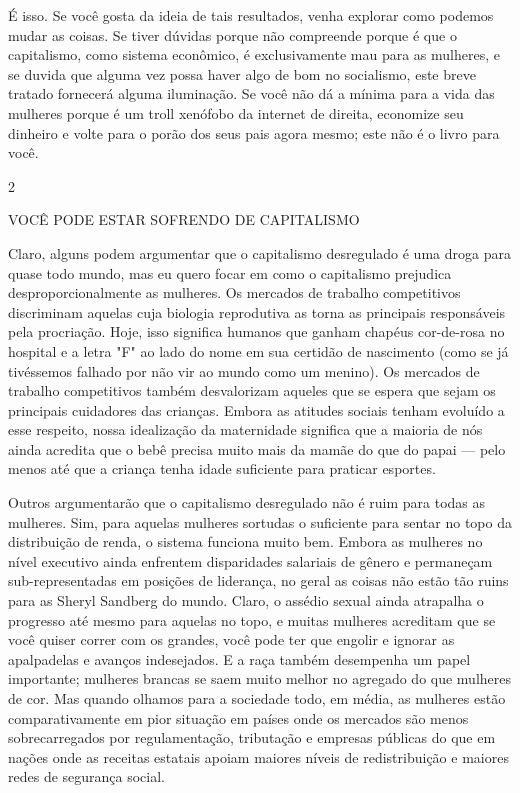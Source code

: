  \par 
É isso. Se você gosta da ideia de tais resultados, venha explorar como podemos mudar as coisas. Se tiver dúvidas porque não compreende porque é que o capitalismo, como sistema econômico, é exclusivamente mau para as mulheres, e se duvida que alguma vez possa haver algo de bom no socialismo, este breve tratado fornecerá alguma iluminação. Se você não dá a mínima para a vida das mulheres porque é um troll xenófobo da internet de direita, economize seu dinheiro e volte para o porão dos seus pais agora mesmo; este não é o livro para você.
 \par 
2
 \par 
VOCÊ PODE ESTAR SOFRENDO DE CAPITALISMO
 \par 
Claro, alguns podem argumentar que o capitalismo desregulado é uma droga para quase todo mundo, mas eu quero focar em como o capitalismo prejudica desproporcionalmente as mulheres. Os mercados de trabalho competitivos discriminam aquelas cuja biologia reprodutiva as torna as principais responsáveis ​​pela procriação. Hoje, isso significa humanos que ganham chapéus cor-de-rosa no hospital e a letra "F" ao lado do nome em sua certidão de nascimento (como se já tivéssemos falhado por não vir ao mundo como um menino). Os mercados de trabalho competitivos também desvalorizam aqueles que se espera que sejam os principais cuidadores das crianças. Embora as atitudes sociais tenham evoluído a esse respeito, nossa idealização da maternidade significa que a maioria de nós ainda acredita que o bebê precisa muito mais da mamãe do que do papai — pelo menos até que a criança tenha idade suficiente para praticar esportes.
 \par 
Outros argumentarão que o capitalismo desregulado não é ruim para todas as mulheres. Sim, para aquelas mulheres sortudas o suficiente para sentar no topo da distribuição de renda, o sistema funciona muito bem. Embora as mulheres no nível executivo ainda enfrentem disparidades salariais de gênero e permaneçam sub-representadas em posições de liderança, no geral as coisas não estão tão ruins para as Sheryl Sandberg do mundo. Claro, o assédio sexual ainda atrapalha o progresso até mesmo para aquelas no topo, e muitas mulheres acreditam que se você quiser correr com os grandes, você pode ter que engolir e ignorar as apalpadelas e avanços indesejados. E a raça também desempenha um papel importante; mulheres brancas se saem muito melhor no agregado do que mulheres de cor. Mas quando olhamos para a sociedade todo, em média, as mulheres estão comparativamente em pior situação em países onde os mercados são menos sobrecarregados por regulamentação, tributação e empresas públicas do que em nações onde as receitas estatais apoiam maiores níveis de redistribuição e maiores redes de segurança social.
